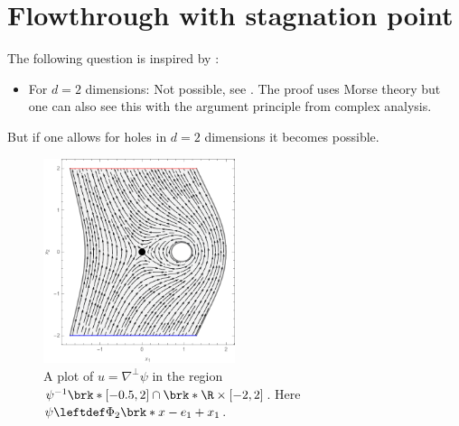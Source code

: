 \section{Flowthrough with stagnation point}

\begin{frame}
  The following question is inspired by \cite{Alber1992}:
  \questionFlowthrough
\end{frame}

\begin{frame}

  {}
  \begin{answer}
    \begin{itemize}
      \item For $d=2$ dimensions: Not possible, see \cite{Koppenhoefer2024}.
        The proof uses Morse theory but one can also see this with the argument principle from complex analysis.
    \end{itemize}
  \end{answer}
\end{frame}

\begin{frame}
  But if one allows for holes in $d=2$ dimensions it becomes possible.
  \begin{figure}
    \centering
    \includegraphics[width=0.5\textwidth]{../Plots/n2_hvf_InflowOutflow_asymmetric_gray_2.pdf}
    \caption{A plot of $u=\nabla^\perp\psi$ in the region $\psi^{-1}\brk*{[-0.5,2]}\cap \brk*{\R\times[-2,2]}$.
    Here $\psi\leftdef\Phi_2\brk*{x-e_1}+x_1$.}
    \label{pl:n2_hvf_InflowOutflow_asymmetric_single}
  \end{figure}
\end{frame}

